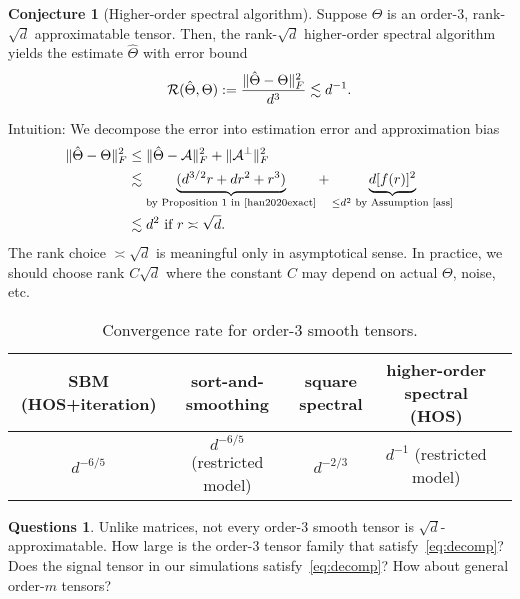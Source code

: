 \documentclass[10pt]{article}
\newcommand*{\KeepStyleUnderBrace}[1]{%
  \mathop{%
    \mathchoice
    {\underbrace{\displaystyle#1}}%
    {\underbrace{\textstyle#1}}%
    {\underbrace{\scriptstyle#1}}%
    {\underbrace{\scriptscriptstyle#1}}%
  }\limits
}
\theoremstyle{definition}
\newtheorem{conjecture}{Conjecture}
\theoremstyle{definition}
\newtheorem{questions}{Questions}
\theoremstyle{definition}
\begin{document}
\begin{conjecture}[Higher-order spectral algorithm] Suppose $\Theta$ is an order-$3$, rank-$\sqrt{d}$ approximatable tensor. Then, the rank-$\sqrt{d}$ higher-order spectral algorithm~\cite{han2020exact} yields the estimate $\hat \Theta$ with error bound
\[
\mathcal{R}(\hat \Theta, \Theta):={\lVert\hat \Theta-\Theta\rVert_F^2\over d^3} \lesssim d^{-1}. 
\]
\end{conjecture}
Intuition: We decompose the error into estimation error and approximation bias
\begin{align}\label{eq:block}
\FnormSize{}{\hat \Theta-\Theta}^2&\leq \FnormSize{}{\hat \Theta-\tA}^2 +\FnormSize{}{\tA^{\perp}}^2\notag \\
&\lesssim \KeepStyleUnderBrace{(d^{3/2}r+dr^2+r^3)}_{\text{by Proposition 1 in~\cite{han2020exact}}}+ \KeepStyleUnderBrace{d[f(r)]^2}_{\leq d^2 \text{ by Assumption~\ref{ass}}}\notag \\
&\lesssim d^2 \text{ if }r\asymp \sqrt{d}.
\end{align}
The rank choice $\asymp \sqrt{d}$ is meaningful only in asymptotical sense. In practice, we should choose rank $C\sqrt{d}$ where the constant $C$ may depend on actual $\Theta$, noise, etc. 

\begin{table}[http]
\centering
\begin{tabular}{ccccc}
SBM (HOS+iteration)  & sort-and-smoothing & square spectral & higher-order spectral (HOS)\\
\hline
$d^{-6/5}$ & $d^{-6/5}$ (restricted model)& $d^{-2/3}$ & $d^{-1}$ (restricted model)
\end{tabular}
\caption{Convergence rate for order-$3$ smooth tensors.}
\end{table}

\begin{questions}
Unlike matrices, not every order-3 smooth tensor is $\sqrt{d}$-approximatable. How large is the order-3 tensor family that satisfy~\eqref{eq:decomp}? Does the signal tensor in our simulations satisfy~\eqref{eq:decomp}? How about general order-$m$ tensors?
\end{questions}
\end{document}
